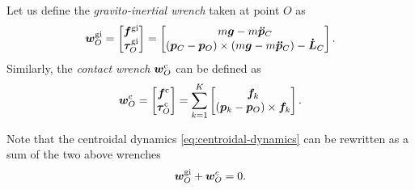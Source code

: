 Let us define the \textit{gravito-inertial wrench} taken at point $O$ as
\begin{equation}
    \label{eq:gravito-intertial-wrench}
    \bm{w}_O^{\rm gi}
    =
    \begin{bmatrix}
        \bm{f}^{\rm gi}\\
        \bm{\tau}_O^{\rm gi}
    \end{bmatrix}
    =
    \begin{bmatrix}
        m \bm{g} - m \bm{\ddot{p}}_C \\
        (\bm{p}_C - \bm{p}_O) \times (m \bm{g} - m \bm{\ddot{p}}_C) - \bm{\dot{L}}_C
    \end{bmatrix}.
\end{equation}
Similarly, the \textit{contact wrench} $\bm{w}_O^{\rm c}$ can be defined as
\begin{equation}
    \label{eq:contact-wrench}
    \bm{w}_O^{\rm c}
    =
    \begin{bmatrix}
        \bm{f}^{\rm c} \\
        \bm{\tau}_O^{\rm c}
    \end{bmatrix}
    =
    \sum_{k=1}^K
    \begin{bmatrix}
        \bm{f}_k\\
        (\bm{p}_k - \bm{p}_O) \times \bm{f}_k
    \end{bmatrix}.
\end{equation}

Note that the centroidal dynamics \eqref{eq:centroidal-dynamics} can be
rewritten as a sum of the two above wrenches
\begin{equation}
    \bm{w}_O^{\rm gi} + \bm{w}_O^c = 0.
\end{equation}

